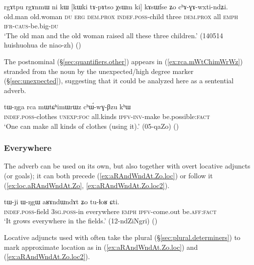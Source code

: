 \begin{exe}
\ex \label{ex:XsWm.kAsWfse}
 \gll rgɤtpu rgɤnmɯ ni kɯ [kɯki tɤ-pɤtso χsɯm ki] kɤsɯfse ʑo cʰɤ-ɣɤ-wxti-ndʑi. \\
 old.man old.woman \textsc{du} \textsc{erg} \textsc{dem}.\textsc{prox} \textsc{indef}.\textsc{poss}-child three \textsc{dem}.\textsc{prox} all \textsc{emph} \textsc{ifr}-\textsc{caus}-be.big-\textsc{du} \\
\glt `The old man and the old woman raised all these three children.' (140514 huishuohua de niao-zh)
()
\end{exe}
  

The postnominal  (§\ref{sec:quantifiers.other}) appears in (\ref{ex:rca.mWtChimWrWz}) stranded from the noun  by the unexpected/high degree marker  (§\ref{sec:unexpected}), suggesting that it could be analyzed here as a sentential adverb.

\begin{exe}
\ex \label{ex:rca.mWtChimWrWz}
\gll tɯ-ŋga rca mɯtɕʰimɯrɯz cʰɯ́-wɣ-βzu kʰɯ \\
\textsc{indef}.\textsc{poss}-clothes \textsc{unexp}:\textsc{foc} all.kinds \textsc{ipfv}-\textsc{inv}-make be.possible:\textsc{fact} \\
\glt `One can make all kinds of clothes (using it).' (05-qaZo)
()
\end{exe}

\subsubsection{Everywhere} \label{sec:everywhere}
The adverb  can be used on its own, but also together with overt locative adjuncts (or goals); it can both precede (\ref{ex:aRAndWndAt.Zo.loc}) or follow it  (\ref{ex:loc.aRAndWndAt.Zo}, \ref{ex:aRAndWndAt.Zo.loc2}). 

 \begin{exe}
\ex \label{ex:loc.aRAndWndAt.Zo}
\gll tɯ-ji ɯ-ŋgɯ aʁɤndɯndɤt ʑo tu-ɬoʁ ɕti. \\
\textsc{indef}.\textsc{poss}-field \textsc{3sg}.\textsc{poss}-in everywhere \textsc{emph} \textsc{ipfv}-come.out be.\textsc{aff}:\textsc{fact} \\
\glt `It grows everywhere in the fields.' (12-ndZiNgri)
()
\end{exe} 

Locative adjuncts used with  often take the plural  (§\ref{sec:plural.determiners}) to mark approximate location as in (\ref{ex:aRAndWndAt.Zo.loc}) and (\ref{ex:aRAndWndAt.Zo.loc2}).

